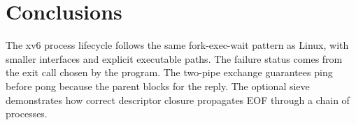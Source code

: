 \chapter{Conclusions}

The xv6 process lifecycle follows the same fork-exec-wait pattern as Linux, with smaller interfaces and explicit executable paths. The failure status comes from the exit call chosen by the program. The two-pipe exchange guarantees ping before pong because the parent blocks for the reply. The optional sieve demonstrates how correct descriptor closure propagates EOF through a chain of processes.
